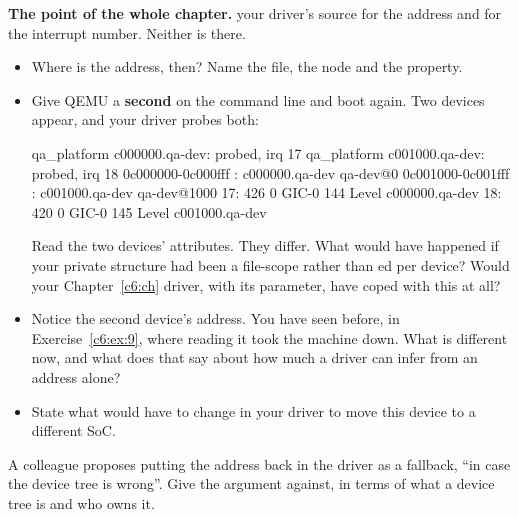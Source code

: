  \textbf{The point of the whole chapter.}  your driver's source for the address
and for the interrupt number. Neither is there.
\begin{itemize}
  \item Where is the address, then? Name the file, the node and the property.
  \item Give QEMU a \textbf{second}  on the command line and boot again. Two
    devices appear, and your driver probes both:
\begin{console}
qa_platform c000000.qa-dev: probed, irq 17
qa_platform c001000.qa-dev: probed, irq 18
0c000000-0c000fff : c000000.qa-dev qa-dev@0
0c001000-0c001fff : c001000.qa-dev qa-dev@1000
 17:  426  0  GIC-0 144 Level  c000000.qa-dev
 18:  420  0  GIC-0 145 Level  c001000.qa-dev
\end{console}

    Read the two devices'  attributes. They differ. What would have happened if
    your private structure had been a file-scope  rather than ed per
    device? Would your Chapter~\ref{c6:ch} driver, with its  parameter, have coped with
    this at all?
  \item Notice the second device's address. You have seen  before, in
    Exercise~\ref{c6:ex:9}, where reading it took the machine down. What is different now, and
    what does that say about how much a driver can infer from an address alone?
  \item State what would have to change in your driver to move this device to a different SoC.
\end{itemize}

 A colleague proposes putting the address back in the driver as a fallback, ``in case the
device tree is wrong''. Give the argument against, in terms of what a device tree is and who owns
it.
